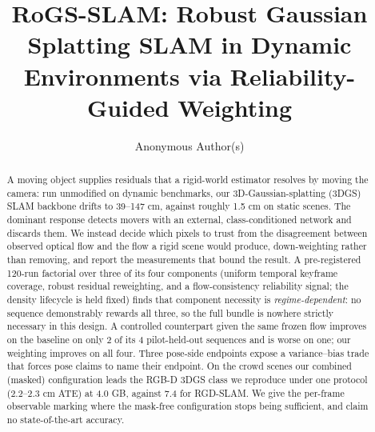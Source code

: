 \documentclass[a4paper,runningheads]{llncs}
\begin{document}
\title{RoGS-SLAM: Robust Gaussian Splatting SLAM in Dynamic
Environments via Reliability-Guided Weighting}
\author{Anonymous Author(s)}

\maketitle

\begin{abstract}
A moving object supplies residuals that a rigid-world estimator resolves by moving the
camera: run unmodified on dynamic benchmarks, our 3D-Gaussian-splatting (3DGS) SLAM backbone
drifts to 39--147 cm,
against roughly 1.5 cm on static scenes. The dominant response detects movers with an
external, class-conditioned network and discards them. We instead decide which pixels to
trust from the disagreement between observed optical flow and the flow a rigid scene
would produce, down-weighting rather than removing, and report the measurements that
bound the result. A pre-registered 120-run factorial over three of its four components (uniform
temporal keyframe coverage, robust residual reweighting, and a
flow-consistency reliability signal; the density lifecycle is held fixed) finds that component necessity is
\emph{regime-dependent}: no sequence demonstrably rewards all three, so the full
bundle is nowhere strictly necessary in this design. A controlled counterpart given the
same frozen flow improves on the baseline on only 2 of its 4 pilot-held-out sequences
and is worse on one; our weighting improves on all four. Three pose-side endpoints
expose a variance--bias trade that forces pose claims to name their endpoint. On the crowd scenes our combined
(masked) configuration leads the RGB-D 3DGS class we reproduce under one protocol
(2.2--2.3 cm ATE) at 4.0 GB, against 7.4 for RGD-SLAM. We give the per-frame observable marking where the mask-free configuration stops
being sufficient, and claim no state-of-the-art accuracy.

\end{abstract}





\clearpage
\small\setlength{\itemsep}{0pt}


\enlargethispage{12\baselineskip}
\end{document}
